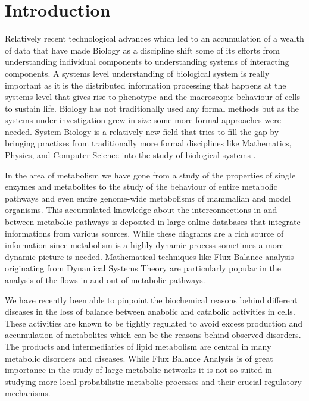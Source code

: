

\chapter{Introduction}  %

\ifpdf
    \graphicspath{{Chapter1/Figs/Raster/}{Chapter1/Figs/PDF/}{Chapter1/Figs/}}
\else
    \graphicspath{{Chapter1/Figs/Vector/}{Chapter1/Figs/}}
\fi

Relatively recent technological advances which led to an accumulation
of a wealth of data that have made Biology as a
discipline shift some of its efforts from understanding individual
components to understanding systems of interacting components. A
systems level understanding of biological system is really important
as it is the distributed information processing that happens at the
systems level that gives rise to phenotype and the macroscopic
behaviour of cells to sustain life. Biology has not traditionally used
any formal methods but as the systems under investigation grew in size
some more formal approaches were needed. System Biology is a relatively
new field that tries to fill the gap by bringing practises from
traditionally more formal disciplines like Mathematics, Physics, and
Computer Science into the study of biological systems \cite [] {ideker2001new}.

In the area of metabolism we have gone from a study of the properties
of single enzymes and metabolites to the study of the behaviour of
entire metabolic pathways and even entire genome-wide metabolisms
of mammalian and model organisms. This accumulated knowledge about the
interconnections in and between metabolic pathways is deposited in
large online databases that integrate informations from various
sources. While these diagrams are a rich source of information
since metabolism is a highly dynamic process sometimes a more dynamic
picture is needed. Mathematical techniques like Flux Balance analysis
originating from Dynamical Systems Theory are particularly popular in
the analysis of the flows in and out of metabolic pathways.

We have recently been able to pinpoint the biochemical reasons behind
different diseases in the loss of balance between anabolic and catabolic
activities in cells. These activities are known to be tightly
regulated to avoid excess production and accumulation of metabolites
which can be the reasons behind observed disorders. The products and
intermediaries of lipid metabolism are central in many metabolic
disorders and diseases. While Flux Balance
Analysis is of great importance in the study of large metabolic
networks it is not so suited in studying more local probabilistic metabolic
processes and their crucial regulatory mechanisms.

